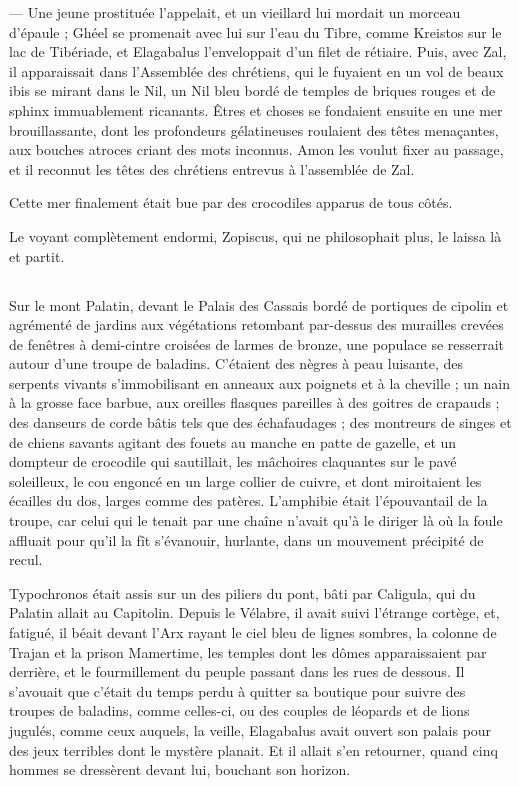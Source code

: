 \documentclass[a4paper, 11pt, oneside, polutonikogreek, french]{article}
\begin{document}
--- Une jeune prostituée l'appelait, et un vieillard lui mordait un morceau d'épaule ; Ghéel se promenait avec lui sur l'eau du Tibre, comme Kreistos sur le lac de Tibériade, et Elagabalus l'enveloppait d'un filet de rétiaire. Puis, avec Zal, il apparaissait dans l'Assemblée des chrétiens, qui le fuyaient en un vol de beaux ibis se mirant dans le Nil, un Nil bleu bordé de temples de briques rouges et de sphinx immuablement ricanants. Êtres et choses se fondaient ensuite en une mer brouillassante, dont les profondeurs gélatineuses roulaient des têtes menaçantes, aux bouches atroces criant des mots inconnus. Amon les voulut fixer au passage, et il reconnut les têtes des chrétiens entrevus à l'assemblée de Zal.

Cette mer finalement était bue par des crocodiles apparus de tous côtés.

Le voyant complètement endormi, Zopiscus, qui ne philosophait plus, le laissa là et partit.
\clearpage
\subsection{}
\paragraph{}
Sur le mont Palatin, devant le Palais des Cassais bordé de portiques de cipolin et agrémenté de jardins aux végétations retombant par-dessus des murailles crevées de fenêtres à demi-cintre croisées de larmes de bronze, une populace se resserrait autour d'une troupe de baladins. C'étaient des nègres à peau luisante, des serpents vivants s'immobilisant en anneaux aux poignets et à la cheville ; un nain à la grosse face barbue, aux oreilles flasques pareilles à des goitres de crapauds ; des danseurs de corde bâtis tels que des échafaudages ; des montreurs de singes et de chiens savants agitant des fouets au manche en patte de gazelle, et un dompteur de crocodile qui sautillait, les mâchoires claquantes sur le pavé soleilleux, le cou engoncé en un large collier de cuivre, et dont miroitaient les écailles du dos, larges comme des patères. L'amphibie était l'épouvantail de la troupe, car celui qui le tenait par une chaîne n'avait qu'à le diriger là où la foule affluait pour qu'il la fît s'évanouir, hurlante, dans un mouvement précipité de recul.

Typochronos était assis sur un des piliers du pont, bâti par Caligula, qui du Palatin allait au Capitolin. Depuis le Vélabre, il avait suivi l'étrange cortège, et, fatigué, il béait devant l'Arx rayant le ciel bleu de lignes sombres, la colonne de Trajan et la prison Mamertime, les temples dont les dômes apparaissaient par derrière, et le fourmillement du peuple passant dans les rues de dessous. Il s'avouait que c'était du temps perdu à quitter sa boutique pour suivre des troupes de baladins, comme celles-ci, ou des couples de léopards et de lions jugulés, comme ceux auquels, la veille, Elagabalus avait ouvert son palais pour des jeux terribles dont le mystère planait. Et il allait s'en retourner, quand cinq hommes se dressèrent devant lui, bouchant son horizon.
\end{document}
